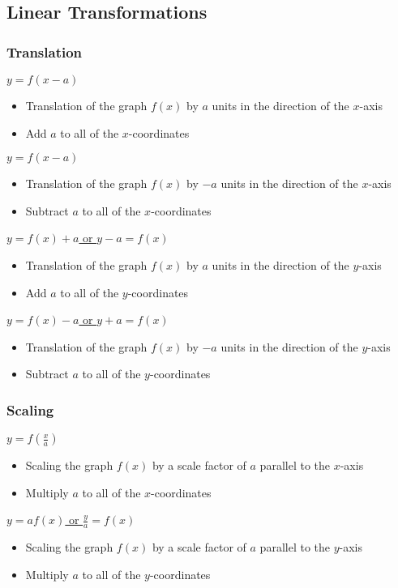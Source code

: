 \documentclass[../main.tex]{subfiles}
\begin{document}
\subsection{Linear Transformations}
\subsubsection{Translation}
\underline{\(y=f(x-a)\)}
\begin{itemize}
    \item Translation of the graph \(f(x)\) by \(a\) units in the direction of the \(x\)-axis
    \item Add \(a\) to all of the \(x\)-coordinates
\end{itemize}
\underline{\(y=f(x-a)\)}
\begin{itemize}
    \item Translation of the graph \(f(x)\) by \(-a\) units in the direction of the \(x\)-axis
    \item Subtract \(a\) to all of the \(x\)-coordinates
\end{itemize}
\underline{\(y=f(x)+a\) or \(y-a=f(x)\)}
\begin{itemize}
    \item Translation of the graph \(f(x)\) by \(a\) units in the direction of the \(y\)-axis
    \item Add \(a\) to all of the \(y\)-coordinates
\end{itemize}
\underline{\(y=f(x)-a\) or \(y+a=f(x)\)}
\begin{itemize}
    \item Translation of the graph \(f(x)\) by \(-a\) units in the direction of the \(y\)-axis
    \item Subtract \(a\) to all of the \(y\)-coordinates
\end{itemize}
\newpage

\subsubsection{Scaling}
\underline{\(\displaystyle y=f\left(\frac{x}{a}\right)\)}
\begin{itemize}
    \item Scaling the graph \(f(x)\) by a scale factor of \(a\) parallel to the \(x\)-axis
    \item Multiply \(a\) to all of the \(x\)-coordinates
\end{itemize}
\underline{\(y=af(x)\) or \(\displaystyle \frac{y}{a}=f(x)\)}
\begin{itemize}
    \item Scaling the graph \(f(x)\) by a scale factor of \(a\) parallel to the \(y\)-axis
    \item Multiply \(a\) to all of the \(y\)-coordinates
\end{itemize}
\end{document}
